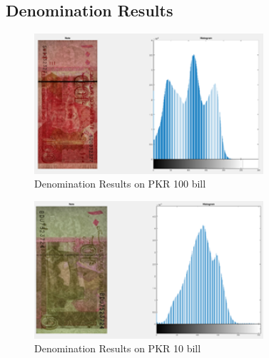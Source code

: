 \documentclass{article}
\begin{document}
\subsection{Denomination Results}
\begin{figure}[ht]

\begin{minipage}[b]{1.0\linewidth}
  \centering
  \centerline{\includegraphics[width=8.5cm]{denomination1.png}}
  \vspace{-3mm}
\end{minipage}
%
\caption{Denomination Results on PKR 100 bill}
\label{fig:100rs}
\vspace{-3mm}
\end{figure}

\begin{figure}[ht]

\begin{minipage}[b]{1.0\linewidth}
  \centering
  \centerline{\includegraphics[width=8.5cm]{denomination2.png}}
  \vspace{-3mm}
\end{minipage}
%
\caption{Denomination Results on PKR 10 bill}
\label{fig:10rs}
\vspace{-3mm}
\end{figure}
\end{document}
